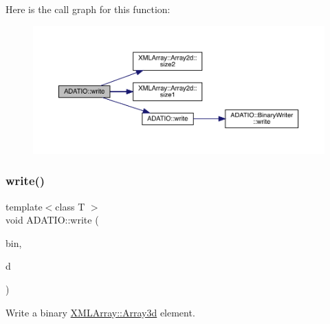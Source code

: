 Here is the call graph for this function\+:\nopagebreak
\begin{figure}[H]
\begin{center}
\leavevmode
\includegraphics[width=350pt]{d0/dba/namespaceADATIO_a6e67aa5fde8e34135bde219592b6b55a_cgraph}
\end{center}
\end{figure}
\mbox{\label{namespaceADATIO_a7fbf1297a893fe12c3b03b9594408829}} 
\subsubsection{\texorpdfstring{write()}{write()}\hspace{0.1cm}{\footnotesize\ttfamily [18/25]}}
{\footnotesize\ttfamily template$<$class T $>$ \\
void A\+D\+A\+T\+I\+O\+::write (\begin{DoxyParamCaption}\item[{\mbox{\hyperlink{classADATIO_1_1BinaryWriter}{Binary\+Writer}} \&}]{bin,  }\item[{const \mbox{\hyperlink{classXMLArray_1_1Array3d}{X\+M\+L\+Array\+::\+Array3d}}$<$ T $>$ \&}]{d }\end{DoxyParamCaption})\hspace{0.3cm}{\ttfamily [inline]}}



Write a binary \mbox{\hyperlink{classXMLArray_1_1Array3d}{X\+M\+L\+Array\+::\+Array3d}} element. 

